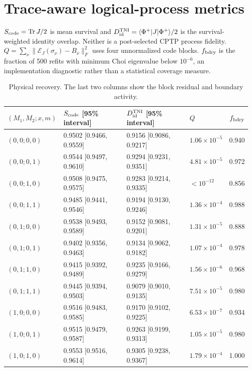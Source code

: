 \documentclass[10pt,a4paper]{article}
\newcommand{\Tr}{\operatorname{Tr}}\newcommand{\CX}{\mathrm{CX}}\newcommand{\Ccode}{\mathcal C}
\begin{document}
\section{Trace-aware logical-process metrics}
$S_{\rm code}=\Tr J/2$ is mean survival and $D_{\rm id}^{\rm TNI}=\langle\Phi^+|J|\Phi^+\rangle/2$ is the survival-weighted identity overlap. Neither is a post-selected CPTP process fidelity. $Q=\sum_\nu\|\mathcal E_J(\sigma_\nu)-B_\nu\|_F^2$ uses four unnormalized code blocks. $f_{\rm bdry}$ is the fraction of 500 refits with minimum Choi eigenvalue below $10^{-6}$, an implementation diagnostic rather than a statistical coverage measure.
\par\begin{table}[htbp]\centering\footnotesize
\caption{Physical recovery. The last two columns show the block residual and boundary activity.}\label{stab:process_physical}
\begin{tabular}{llllr}\toprule
$(M_1,M_2;x,m)$ & $S_{\rm code}$ [95\% interval] & $D_{\rm id}^{\rm TNI}$ [95\% interval] & $Q$ & $f_{\rm bdry}$\\\midrule
$(0,0;0,0)$ & 0.9502 [0.9466, 0.9559] & 0.9156 [0.9086, 0.9217] & $1.06\times10^{-5}$ & 0.940 \\
$(0,0;0,1)$ & 0.9544 [0.9497, 0.9610] & 0.9294 [0.9231, 0.9351] & $4.81\times10^{-5}$ & 0.972 \\
$(0,0;1,0)$ & 0.9508 [0.9475, 0.9575] & 0.9283 [0.9214, 0.9335] & $<10^{-12}$ & 0.856 \\
$(0,0;1,1)$ & 0.9485 [0.9441, 0.9546] & 0.9194 [0.9130, 0.9246] & $1.36\times10^{-4}$ & 0.988 \\
$(0,1;0,0)$ & 0.9538 [0.9493, 0.9589] & 0.9152 [0.9081, 0.9201] & $1.31\times10^{-5}$ & 0.888 \\
$(0,1;0,1)$ & 0.9402 [0.9356, 0.9463] & 0.9134 [0.9062, 0.9182] & $1.07\times10^{-4}$ & 0.978 \\
$(0,1;1,0)$ & 0.9415 [0.9392, 0.9489] & 0.9235 [0.9166, 0.9279] & $1.56\times10^{-6}$ & 0.968 \\
$(0,1;1,1)$ & 0.9445 [0.9394, 0.9503] & 0.9079 [0.9010, 0.9135] & $7.51\times10^{-5}$ & 0.980 \\
$(1,0;0,0)$ & 0.9516 [0.9483, 0.9585] & 0.9170 [0.9102, 0.9225] & $6.53\times10^{-7}$ & 0.934 \\
$(1,0;0,1)$ & 0.9515 [0.9479, 0.9587] & 0.9263 [0.9199, 0.9313] & $1.05\times10^{-5}$ & 0.980 \\
$(1,0;1,0)$ & 0.9553 [0.9516, 0.9614] & 0.9305 [0.9238, 0.9367] & $1.79\times10^{-4}$ & 1.000 \\

\end{tabular}
\end{table}
\end{document}
